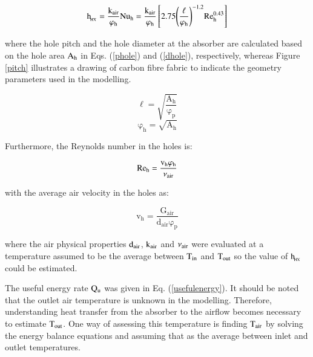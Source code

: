 \vspace{-0.75cm}
\begin{equation}
\mathrm{{h_{\!_{HX}}} = \frac{{{k_{air}}}}{{{\varphi_h}}}Nu_{h} = \frac{{{k_{air}}}}{{{\varphi_h}}}\left[ {2.75{{\left( {\frac{\ell }{{{\varphi_h}}}} \right)}^{ - 1.2}}{\rm{Re}}_{h}^{0.43}} \right]}
\label{convectionholes}
\end{equation}

\noindent where the hole pitch and the hole diameter at the absorber are calculated based on the hole area $\rm{A_h}$ in Eqs. (\ref{phole}) and (\ref{dhole}), respectively, whereas Figure \ref{pitch} illustrates a drawing of carbon fibre fabric to indicate the geometry parameters used in the modelling. 

\vspace{-0.75cm}
\begin{equation}
\mathrm{\ell = \sqrt{\frac{{{\mathrm{A_h}}}}{\varphi_{\mathrm{p}}}}}
\label{phole}
\end{equation}
\vspace*{-0.25cm}
\begin{equation}
\mathrm{{\varphi_h} = \sqrt{{\mathrm{A_h}}}}
\label{dhole}
\end{equation}


Furthermore, the Reynolds number in the holes is:

\vspace{-0.75cm}
\begin{equation}
\mathrm{{{\mathop{\rm Re}\nolimits} _h} = \frac{{{v_h}{\varphi_h}}}{{{\mathlarger{\nu} _{air}}}}}
\label{reynoldshole}
\end{equation}

\noindent with the average air velocity in the holes as:

\vspace{-0.75cm}
\begin{equation}
\mathrm{{v_h} = \frac{{{G_{air}}}}{{{d_{air}}\varphi_p}}}
\label{vh}
\end{equation}

\noindent where the air physical properties $\rm{d_{air}}$, $\rm{k_{air}}$ and $\rm{\nu_{air}}$ were evaluated at a temperature assumed to be the average between $\rm{T_{in}}$ and $\rm{T_{out}}$ so the value of $\rm{h_{\!_{HX}}}$ could be estimated. 

The useful energy rate $\rm{Q_u}$ was given in Eq. (\ref{usefulenergy}). It should be noted that the outlet air temperature is unknown in the modelling. Therefore, understanding heat transfer from the absorber to the airflow becomes necessary to estimate $\rm{T_{out}}$. One way of assessing this temperature is finding $\rm{T_{air}}$ by solving the energy balance equations and assuming that as the average between inlet and outlet temperatures.

